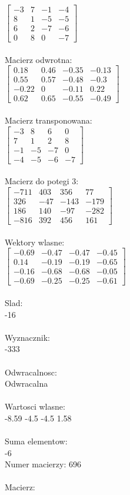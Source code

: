 \documentclass[a4paper,12pt]{article}
\begin{document}
$\begin{bmatrix} -3&7&-1&-4\\8&1&-5&-5\\6&2&-7&-6\\0&8&0&-7 \end{bmatrix}$
\\
\\
Macierz odwrotna:\\

$\begin{bmatrix} 0.18&0.46&-0.35&-0.13\\0.55&0.57&-0.48&-0.3\\-0.22&0&-0.11&0.22\\0.62&0.65&-0.55&-0.49 \end{bmatrix}$
\\
\\
Macierz transponowana:\\

$\begin{bmatrix} -3&8&6&0\\7&1&2&8\\-1&-5&-7&0\\-4&-5&-6&-7 \end{bmatrix}$
\\
\\
Macierz do potegi 3:\\

$\begin{bmatrix} -711&403&356&77\\326&-47&-143&-179\\186&140&-97&-282\\-816&392&456&161 \end{bmatrix}$
\\
\\
Wektory wlasne:\\

$\begin{bmatrix} -0.69&-0.47&-0.47&-0.45\\0.14&-0.19&-0.19&-0.65\\-0.16&-0.68&-0.68&-0.05\\-0.69&-0.25&-0.25&-0.61 \end{bmatrix}$
\\
\\
Slad:\\
-16
\\
\\
Wyznacznik:\\
-333
\\
\\
Odwracalnosc:\\
Odwracalna
\\
\\
Wartosci wlasne:\\
-8.59 -4.5 -4.5 1.58
\\
\\
Suma elementow:\\
-6
\\
\newpage
Numer macierzy:
696
\\
\\
Macierz:\\
\end{document}
